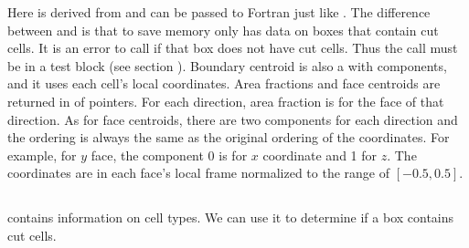 \documentclass[letterpaper,10pt,english]{sphinxmanual}
\begin{document}
\sphinxAtStartPar
Here  is derived from  and can be passed to Fortran
just like . The difference between  and
 is that to save memory  only has data on boxes
that contain cut cells. It is an error to call  if that box
does not have cut cells. Thus the call must be in a  test block (see
section {\hyperref[\detokenize{EB:sec-eb-flag}]{}}). Boundary centroid is also a  with
 components, and it uses each cell’s local coordinates. Area
fractions and face centroids are returned in  of 
pointers. For each direction, area fraction is for the face of that direction.
As for face centroids, there are two components for each direction and the
ordering is always the same as the original ordering of the coordinates. For
example, for \(y\) face, the component 0 is for \(x\) coordinate and 1
for \(z\). The coordinates are in each face’s local frame normalized to the
range of \([-0.5,0.5]\).


\subsection{}
\label{\detokenize{EB:ebcellflagfab}}\label{\detokenize{EB:sec-eb-flag}}
\sphinxAtStartPar
{} contains information on cell types.  We can use
it to determine if a box contains cut cells.
\end{document}
